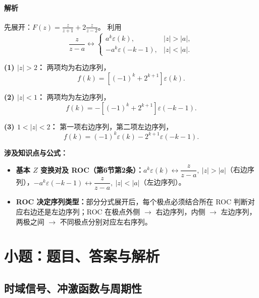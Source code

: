 \documentclass[12pt,a4paper]{ctexart}
\newcommand{\eps}{\varepsilon}
\begin{document}
\paragraph{解析}
先展开：\(\displaystyle F(z)=\frac{z}{z+1}+2\frac{z}{z-2}\)。
利用
\[
\frac{z}{z-a}\longleftrightarrow
\begin{cases}
a^k\eps(k),&|z|>|a|,\\
-a^k\eps(-k-1),&|z|<|a|.
\end{cases}
\]

\textbf{(1) $|z|>2$：} 两项均为右边序列，
\[
\boxed{
f(k)=\left[(-1)^k+2^{k+1}\right]\eps(k).}
\]

\textbf{(2) $|z|<1$：} 两项均为左边序列，
\[
\boxed{
f(k)=-\left[(-1)^k+2^{k+1}\right]\eps(-k-1).}
\]

\textbf{(3) $1<|z|<2$：} 第一项右边序列，第二项左边序列，
\[
\boxed{
f(k)=(-1)^k\eps(k)-2^{k+1}\eps(-k-1).}
\]

\textbf{涉及知识点与公式：}
\begin{itemize}
    \item \textbf{基本 $Z$ 变换对及 ROC（第6节第2条）：}$a^k\eps(k)\longleftrightarrow \dfrac{z}{z-a},\ |z|>|a|$（右边序列），$-a^k\eps(-k-1)\longleftrightarrow \dfrac{z}{z-a},\ |z|<|a|$（左边序列）。
    \item \textbf{ROC 决定序列类型：}部分分式展开后，每个极点必须结合所在 ROC 判断对应右边还是左边序列；ROC 在极点外侧 $\to$ 右边序列，内侧 $\to$ 左边序列，两极之间 $\to$ 不同极点分别对应左右序列。
\end{itemize}

\newpage
\section{小题：题目、答案与解析}

\subsection{时域信号、冲激函数与周期性}
\end{document}
